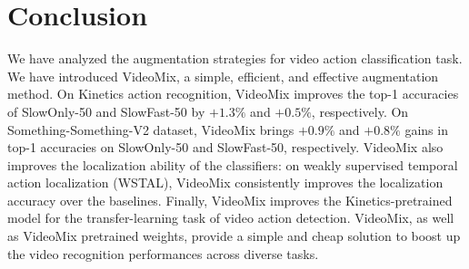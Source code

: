 \section{Conclusion}
\label{section:conclusion}

We have analyzed the augmentation strategies for video action classification task. We have introduced VideoMix, a simple, efficient, and effective augmentation method.
On Kinetics action recognition, VideoMix improves the top-1 accuracies of SlowOnly-50 and SlowFast-50 by $+1.3\%$ and $+0.5\%$, respectively. 
On Something-Something-V2 dataset, VideoMix brings $+0.9\%$ and $+0.8\%$ gains in top-1 accuracies on SlowOnly-50 and SlowFast-50, respectively. 
VideoMix also improves the localization ability of the classifiers: on weakly supervised temporal action localization (WSTAL), VideoMix consistently improves the localization accuracy over the baselines.
Finally, VideoMix improves the Kinetics-pretrained model for the transfer-learning task of video action detection. VideoMix, as well as VideoMix pretrained weights, provide a simple and cheap solution to boost up the video recognition performances across diverse tasks.